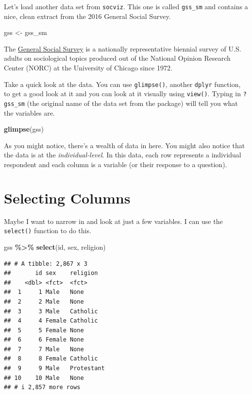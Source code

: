 \documentclass[
]{book}
\newenvironment{Shaded}{\begin{snugshade}}{\end{snugshade}}
\newcommand{\FunctionTok}[1]{\textcolor[rgb]{0.13,0.29,0.53}{\textbf{#1}}}
\newcommand{\NormalTok}[1]{#1}
\newcommand{\OtherTok}[1]{\textcolor[rgb]{0.56,0.35,0.01}{#1}}
\newcommand{\SpecialCharTok}[1]{\textcolor[rgb]{0.81,0.36,0.00}{\textbf{#1}}}
\begin{document}
Let's load another data set from \texttt{socviz}. This one is called \texttt{gss\_sm} and contains a nice, clean extract from the 2016 General Social Survey.

\begin{Shaded}
\begin{Highlighting}[]
\NormalTok{gss }\OtherTok{\textless{}{-}}\NormalTok{ gss\_sm}
\end{Highlighting}
\end{Shaded}

The \href{https://gss.norc.org/}{General Social Survey} is a nationally representative biennial survey of U.S. adults on sociological topics produced out of the National Opinion Research Center (NORC) at the University of Chicago since 1972.

Take a quick look at the data. You can use \texttt{glimpse()}, another \texttt{dplyr} function, to get a good look at it and you can look at it visually using \texttt{view()}. Typing in \texttt{?gss\_sm} (the original name of the data set from the package) will tell you what the variables are.

\begin{Shaded}
\begin{Highlighting}[]
\FunctionTok{glimpse}\NormalTok{(gss)}
\end{Highlighting}
\end{Shaded}

As you might notice, there's a wealth of data in here. You might also notice that the data is at the \emph{individual-level}. In this data, each row represents a individual respondent and each column is a variable (or their response to a question).

\hypertarget{selecting-columns}{%
\section{Selecting Columns}\label{selecting-columns}}

Maybe I want to narrow in and look at just a few variables. I can use the \texttt{select()} function to do this.

\begin{Shaded}
\begin{Highlighting}[]
\NormalTok{gss }\SpecialCharTok{\%\textgreater{}\%}
  \FunctionTok{select}\NormalTok{(id, sex, religion)}
\end{Highlighting}
\end{Shaded}

\begin{verbatim}
## # A tibble: 2,867 x 3
##       id sex    religion  
##    <dbl> <fct>  <fct>     
##  1     1 Male   None      
##  2     2 Male   None      
##  3     3 Male   Catholic  
##  4     4 Female Catholic  
##  5     5 Female None      
##  6     6 Female None      
##  7     7 Male   None      
##  8     8 Female Catholic  
##  9     9 Male   Protestant
## 10    10 Male   None      
## # i 2,857 more rows
\end{verbatim}
\end{document}
